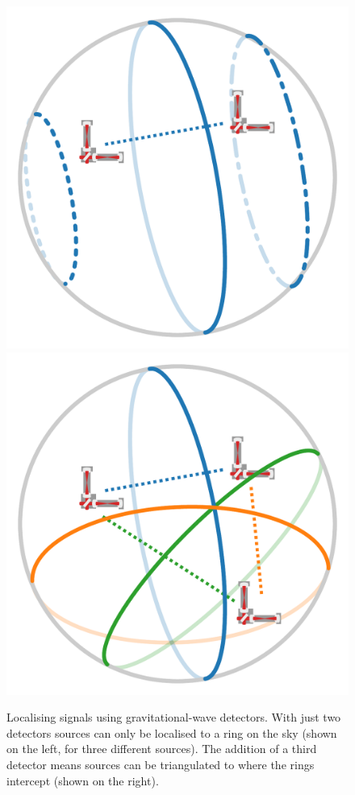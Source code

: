 \begin{colsection}
\begin{figure}[t]
    \begin{center}
        \includegraphics[width=0.4\linewidth]{images/triangulate_1.pdf}
        \includegraphics[width=0.4\linewidth]{images/triangulate_2.pdf}
    \end{center}
    \caption[Localising signals using gravitational-wave detectors]{
        Localising signals using gravitational-wave detectors. With just two detectors sources can only be localised to a ring on the sky (shown on the left, for three different sources). The addition of a third detector means sources can be triangulated to where the rings intercept (shown on the right).
        }\label{fig:triangulate}
\end{figure}

\newpage


\end{colsection}
